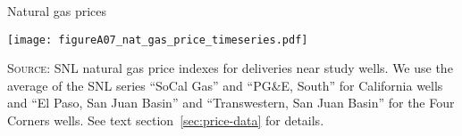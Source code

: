 \caption{Natural gas prices}
\label{fig:nat-gas-price-timeseries}
\texttt{[image: figureA07\_nat\_gas\_price\_timeseries.pdf]}

\textsc{Source:}
\gls{SNL} natural gas price indexes for deliveries near study wells.
We use the average of the \gls{SNL} series ``SoCal Gas'' and ``PG\&E, South'' for California wells and
``El Paso, San Juan Basin'' and ``Transwestern, San Juan Basin'' for the Four Corners wells.
See text section~\ref{sec:price-data} for details.
